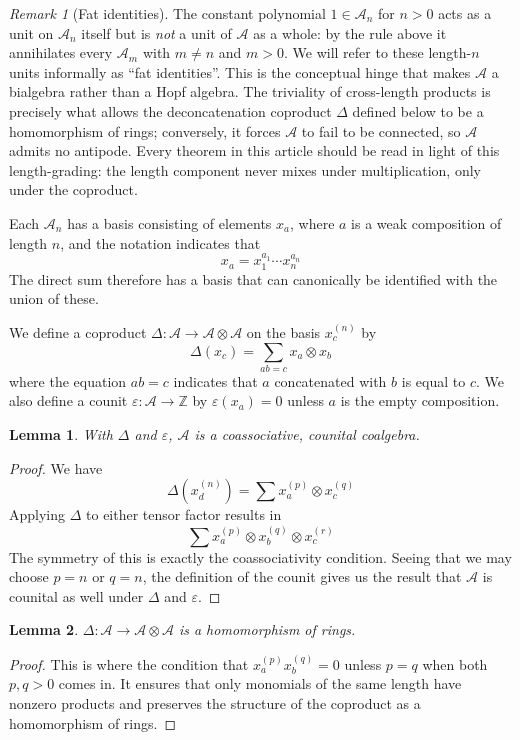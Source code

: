 \documentclass[a4paper,fleqn]{cas-sc}
\newtheorem{lemma}{Lemma}[subsection]
\theoremstyle{definition}
\theoremstyle{remark}
\newtheorem*{remark}{Remark}
\numberwithin{equation}{subsection}
\newcommand{\coma}{\mathcal{A}}
\begin{document}
\begin{remark}[Fat identities]\label{remark:fatidentity}
The constant polynomial $1\in\coma_n$ for $n>0$ acts as a unit on $\coma_n$ itself but is \emph{not} a unit of $\coma$ as a whole: by the rule above it annihilates every $\coma_m$ with $m\neq n$ and $m>0$. We will refer to these length-$n$ units informally as ``fat identities''. This is the conceptual hinge that makes $\coma$ a bialgebra rather than a Hopf algebra. The triviality of cross-length products is precisely what allows the deconcatenation coproduct $\Delta$ defined below to be a homomorphism of rings; conversely, it forces $\coma$ to fail to be connected, so $\coma$ admits no antipode. Every theorem in this article should be read in light of this length-grading: the length component never mixes under multiplication, only under the coproduct.
\end{remark}

Each $\coma_n$ has a basis consisting of elements $x_a$, where $a$ is a weak composition of length $n$, and the notation indicates that
$$x_a = x_1^{a_1}\cdots x_n^{a_n}$$
The direct sum therefore has a basis that can canonically be identified with the union of these.

We define a coproduct $\Delta:\coma\to\coma\otimes\coma$ on the basis $x_c^{(n)}$ by
$$\Delta(x_c) = \sum_{ab=c} x_a\otimes x_b$$
where the equation $ab=c$ indicates that $a$ concatenated with $b$ is equal to $c$. We also define a counit $\varepsilon:\coma\to \mathbb{Z}$ by $\varepsilon(x_a)=0$ unless $a$ is the empty composition.

\begin{lemma}
	With $\Delta$ and $\varepsilon$, $\coma$ is a coassociative, counital coalgebra.
\end{lemma}
\begin{proof}
	We have 
	$$\Delta(x_d^{(n)})=\sum x_a^{(p)}\otimes x_c^{(q)}$$
	Applying $\Delta$ to either tensor factor results in
	$$\sum x_a^{(p)}\otimes x_b^{(q)}\otimes x_c^{(r)}$$
	The symmetry of this is exactly the coassociativity condition. Seeing that we may choose $p=n$ or $q=n$, the definition of the counit gives us the result that $\coma$ is counital as well under $\Delta$ and $\varepsilon$.
\end{proof}

\begin{lemma}
	$\Delta:\coma\to\coma\otimes\coma$ is a homomorphism of rings.
\end{lemma}
\begin{proof}
	This is where the condition that $x_a^{(p)}x_b^{(q)}=0$ unless $p=q$ when both $p,q>0$ comes in. It ensures that only monomials of the same length have nonzero products and preserves the structure of the coproduct as a homomorphism of rings.
\end{proof}
\end{document}
